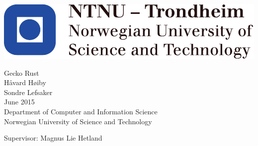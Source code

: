 
\thispagestyle{empty}
\includegraphics[scale=1.1]{figures/NTNU}
\mbox{}\\[6pc]
\begin{center}

\Huge{Gecko Rust}\\[2pc]

\Large{Håvard Høiby \\ Sondre Lefsaker}\\[1pc]
\large{June 2015}\\[2pc]

Department of Computer and Information Science\\
Norwegian University of Science and Technology
\end{center}
\vfill

\noindent Supervisor: Magnus Lie Hetland
